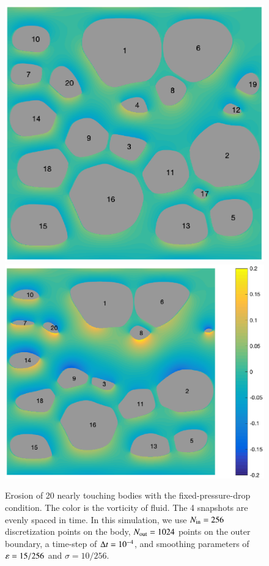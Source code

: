 \documentclass[preprint, 10pt]{elsarticle}
\begin{document}
\begin{figure}[H]
\begin{center}
\includegraphics[width = 0.42 \textwidth]{./figs/20b_dense_201}
\includegraphics[width = 0.507 \textwidth]{./figs/20b_dense_301}
\caption{\label{fig:Eroding20vort} Erosion of 20 nearly touching bodies with the fixed-pressure-drop condition. The color is the vorticity of fluid. The 4 snapshots are evenly spaced in time. In this simulation, we use $N_{\mathrm{in}} = 256$ discretization points on the body, $N_{\mathrm{out}} = 1024$ points on the outer boundary, a time-step of $\Delta t=10^{-4}$, and smoothing parameters of $\varepsilon= 15/256$ and $\sigma=10/256 $.}
\end{center}
\end{figure}
\end{document}
